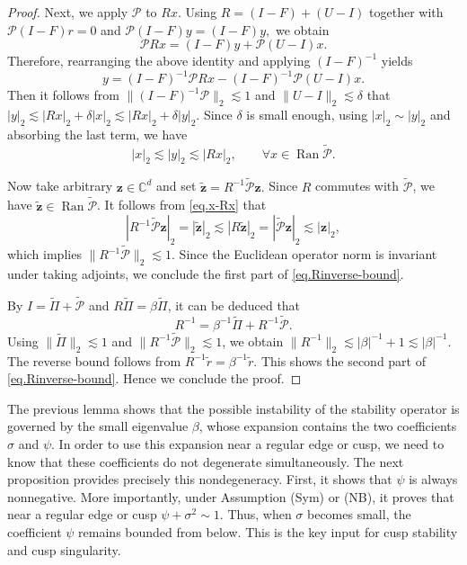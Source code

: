 \documentclass[11pt,twoside, a4paper]{article}
\numberwithin{equation}{section}
\numberwithin{figure}{section}
\theoremstyle{plain} %
\theoremstyle{definition}
\theoremstyle{remark}
\newcommand{\1} {\mspace{1 mu}}
\newcommand{\2} {\mspace{2 mu}}
\DeclareMathOperator{\Ran}{Ran}
\begin{document}
\begin{proof}
Next, we apply \(\mathcal{P}\) to \(Rx\). Using $R=(I-F)+(U-I)$ together with 
$
\mathcal{P}(I-F)r=0$
and
$
\mathcal{P}(I-F)y=(I-F)y,
$
we obtain
\[
\mathcal{P} Rx
=
(I-F)y+\mathcal{P}(U-I)x .
\]
Therefore, rearranging the above identity and applying $(I-F)^{-1}$ yields
\[
y
=
(I-F)^{-1}\mathcal{P} Rx
-
(I-F)^{-1}\mathcal{P}(U-I)x .
\]
Then it follows from 
$
\|(I-F)^{-1}\mathcal{P}\|_2\lesssim 1$
and
$
\|U-I\|_2\lesssim \delta
$
that
$
|y|_2
\lesssim
|Rx|_2+\delta |x|_2
\lesssim
|Rx|_2+\delta |y|_2.
$
Since $\delta$ is small enough, using $|x|_2\sim|y|_2$ and absorbing the last term, we have
\begin{equation}\label{eq.x-Rx}
  |x|_2\lesssim |y|_2\lesssim |Rx|_2,\qquad
\forall x\in \Ran \widetilde{\mathcal{P}} .
\end{equation}



Now take arbitrary \(\mathbf{z}\in\mathbb C^d\) and set
$
\tilde{\mathbf{z}}=R^{-1}\widetilde{\mathcal{P}}\mathbf{z} .
$
Since \(R\) commutes with \(\widetilde{\mathcal{P}}\), we have \(\tilde{\mathbf{z}}\in \Ran\widetilde{\mathcal{P}}\). It follows from \eqref{eq.x-Rx} that
\[
|R^{-1}\widetilde{\mathcal{P}}\mathbf{z}|_2=|\tilde{\mathbf{z}}|_2
\lesssim
|R\tilde{\mathbf{z}}|_2
=
|\widetilde{\mathcal{P}}\mathbf{z}|_2
\lesssim
|\mathbf{z}|_2,
\]
which implies
$
\|R^{-1}\widetilde{\mathcal{P}}\|_2\lesssim 1.
$
Since the Euclidean operator norm is invariant under taking adjoints,
we conclude the first part of \eqref{eq.Rinverse-bound}.

By 
$
I=\widetilde{\Pi}+\widetilde{\mathcal{P}}
$
and \(R\widetilde{\Pi}=\beta \widetilde{\Pi}\), it can be deduced that
\[
R^{-1}
=
\beta^{-1}\widetilde{\Pi}
+
R^{-1}\widetilde{\mathcal{P}}.
\]
Using \(\|\widetilde{\Pi}\|_2\lesssim 1\) and $\|R^{-1}\widetilde{\mathcal{P}}\|_2\lesssim 1$, we obtain
$
\|R^{-1}\|_2
\lesssim
|\beta|^{-1}+1
\lesssim
|\beta|^{-1}.
$
The reverse bound follows from \(R^{-1}\tilde r=\beta^{-1}\tilde r\). This shows the second part of \eqref{eq.Rinverse-bound}. Hence we conclude the proof.


\end{proof}


The previous lemma shows that the possible instability of the stability
operator is governed by the small eigenvalue \(\beta\), whose expansion contains
the two coefficients \(\sigma\) and \(\psi\). In order to use this expansion
near a regular edge or cusp, we need to know that these coefficients do not
degenerate simultaneously. The next proposition provides precisely this
nondegeneracy. First, it shows that \(\psi\) is always nonnegative. More
importantly, under Assumption \textup{(Sym)} or \textup{(NB)}, it proves that
near a regular edge or cusp
$
  \psi+\sigma^2\sim 1 .
$
Thus, when \(\sigma\) becomes small, the coefficient \(\psi\) remains bounded
from below. This is the key input for cusp stability and cusp singularity. 
\end{document}
